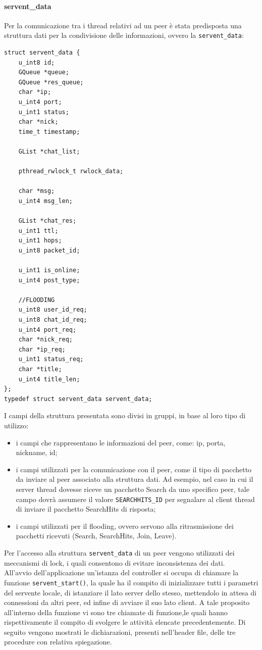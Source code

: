 \paragraph{servent\_data}
Per la comunicazione tra i thread relativi ad un peer è stata predisposta una struttura dati per la condivisione delle informazioni, ovvero la \texttt{servent\_data}:
\begin{lstlisting}[frame=trBL]
struct servent_data {
	u_int8 id;
	GQueue *queue;	
	GQueue *res_queue;
	char *ip;
	u_int4 port;
	u_int1 status;
	char *nick;
	time_t timestamp;
	
	GList *chat_list;

	pthread_rwlock_t rwlock_data;
	
	char *msg;
	u_int4 msg_len;
	
	GList *chat_res;
	u_int1 ttl;
	u_int1 hops;
	u_int8 packet_id;
	
	u_int1 is_online;
	u_int4 post_type;
	
	//FLOODING
	u_int8 user_id_req;
	u_int8 chat_id_req;
	u_int4 port_req;
	char *nick_req;
	char *ip_req;
	u_int1 status_req;
	char *title;
	u_int4 title_len;
};
typedef struct servent_data servent_data;
\end{lstlisting}
I campi della struttura presentata sono divisi in gruppi, in base al loro tipo di utilizzo:
\begin{itemize}
\item i campi che rappresentano le informazioni del peer, come: ip, porta, nickname, id;
\item i campi utilizzati per la comunicazione con il peer, come il tipo di pacchetto da inviare al peer associato alla struttura dati. Ad esempio, nel caso in cui il server thread dovesse riceve un pacchetto Search da uno specifico peer, tale campo dovrà assumere il valore \texttt{SEARCHHITS\_ID} per segnalare al client thread di inviare il pacchetto SearchHits di risposta;
\item i campi utilizzati per il flooding, ovvero servono alla ritrasmissione dei pacchetti ricevuti (Search, SearchHits, Join, Leave).
\end{itemize}
Per l'accesso alla struttura \texttt{servent\_data} di un peer vengono utilizzati dei meccanismi di lock, i quali consentono di evitare inconsistenza dei dati.\\

All'avvio dell'applicazione un'istanza del controller si occupa di chiamare la funzione \texttt{servent\_start()}, la quale ha il compito di inizializzare tutti i parametri del servente locale, di istanziare il lato server dello stesso, mettendolo in attesa di connessioni da altri peer, ed infine di avviare il suo lato client. A tale proposito all'interno della funzione vi sono tre chiamate di funzione,le quali hanno rispettivamente il compito di svolgere le attività elencate precedentemente. Di seguito vengono mostrati le dichiarazioni, presenti nell'header file, delle tre procedure con relativa spiegazione.

